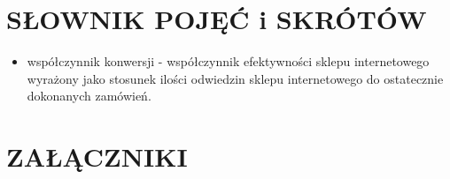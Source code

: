 \section{SŁOWNIK POJĘĆ i SKRÓTÓW}
\begin{itemize}
\item współczynnik konwersji - współczynnik efektywności sklepu internetowego wyrażony jako stosunek ilości odwiedzin sklepu internetowego do ostatecznie dokonanych zamówień.
\end{itemize}
\section{ZAŁĄCZNIKI}
